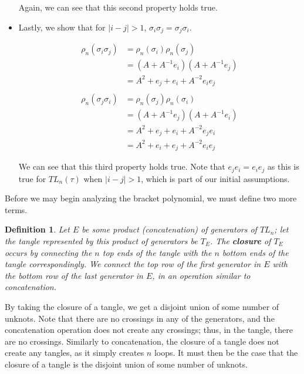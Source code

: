\documentclass[12pt]{article}
\newtheorem{definition}{Definition}[section]
\begin{document}
\begin{itemize}
   Again, we can see that this second property holds true. 
   
   \item Lastly, we show that for $| i - j| > 1$, $\sigma_i \sigma_j = \sigma_j \sigma_i$. 
   
   \begin{align*}
   \rho_n(\sigma_i \sigma_j) &= \rho_n(\sigma_i) \rho_n(\sigma_j) \\
   &= (A + A^{-1} e_i)(A + A^{-1} e_j) \\
   &= A^2 + e_j + e_i + A^{-2} e_i e_j \\ \\
   \rho_n(\sigma_j \sigma_i) &= \rho_n (\sigma_j) \rho_n (\sigma_i) \\
   &= (A + A^{-1} e_j)(A + A^{-1} e_i) \\
   &= A^2 + e_j + e_i + A^{-2} e_j e_i \\
   &= A^2 + e_i + e_j + A^{-2} e_i e_j 
   \end{align*}
   
   We can see that this third property holds true. Note that $e_j e_i = e_i e_j$ as this is true for $TL_n(\tau)$ when $|i - j| > 1$, which is part of our initial assumptions. 
   
   \end{itemize}
   
   Before we may begin analyzing the bracket polynomial, we must define two more terms. 
   
   \begin{definition}
   Let $E$ be some product (concatenation) of generators of $TL_n$; let the tangle represented by this product of generators be $T_E$. The \textbf{closure} of $T_E$ occurs by connecting the $n$ top ends of the tangle with the $n$ bottom ends of the tangle correspondingly. We connect the top row of the first generator in $E$ with the bottom row of the last generator in $E$, in an operation similar to concatenation. 
   \end{definition}
   
   By taking the closure of a tangle, we get a disjoint union of some number of unknots. Note that there are no crossings in any of the generators, and the concatenation operation does not create any crossings; thus, in the tangle, there are no crossings. Similarly to concatenation, the closure of a tangle does not create any tangles, as it simply creates $n$ loops. It must then be the case that the closure of a tangle is the disjoint union of some number of unknots. 
   
\end{document}
